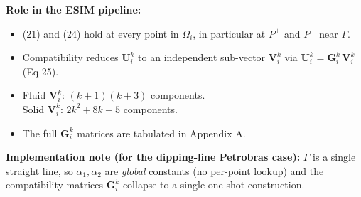 \medskip

\textbf{Role in the ESIM pipeline:}
\begin{itemize}
  \item (21) and (24) hold at every point in $\Omega_i$, in particular
    at $P^+$ and $P^-$ near $\Gamma$.
  \item Compatibility reduces $\boldsymbol{U}_i^k$ to an independent
    sub-vector $\boldsymbol{V}_i^k$ via $\boldsymbol{U}_i^k = \boldsymbol{G}_i^k\,\boldsymbol{V}_i^k$ (Eq 25).
  \item Fluid $\boldsymbol{V}_i^k$: $(k+1)(k+3)$ components.\\
    Solid $\boldsymbol{V}_i^k$: $2k^2 + 8k + 5$ components.
  \item The full $\boldsymbol{G}_i^k$ matrices are tabulated in Appendix A.
\end{itemize}

\textbf{Implementation note (for the dipping-line Petrobras case):}
$\Gamma$ is a single straight line, so $\alpha_1, \alpha_2$ are
\emph{global} constants (no per-point lookup) and the compatibility
matrices $\boldsymbol{G}_i^k$ collapse to a single one-shot
construction.
